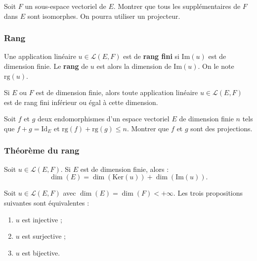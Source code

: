 \documentclass[french]{article}
\renewcommand{\ker}{\text{Ker}}
\newcommand{\rg}{\text{rg}}
\theoremstyle{plain}
\theoremstyle{definition}
\theoremstyle{remark}
\begin{document}
\begin{exo}
	Soit $F$ un sous-espace vectoriel de $E$. Montrer que tous les supplémentaires de $F$ dans $E$ sont isomorphes. On pourra utiliser un projecteur.
\end{exo}

\subsubsection*{Rang}

\begin{dfn}
	Une application linéaire $u\in\mathcal{L}(E,F)$ est de \textbf{rang fini} si $\text{Im}(u)$ est de dimension finie. Le \textbf{rang} de $u$ est alors la dimension de $\text{Im}(u)$. On le note $\rg(u)$.
\end{dfn}

\begin{prop}%
	Si $E$ ou $F$ est de dimension finie, alors toute application linéaire $u\in\mathcal{L}(E,F)$ est de rang fini inférieur ou égal à cette dimension.
\end{prop}

\begin{exo}
	Soit $f$ et $g$ deux endomorphismes d'un espace vectoriel $E$ de dimension finie $n$ tels que $f+g=\text{Id}_E$ et $\rg(f)+\rg(g)\leqslant n$. Montrer que $f$ et $g$ sont des projections.
\end{exo}

\subsubsection*{Théorème du rang}

\begin{thm}%
	Soit $u\in\mathcal{L}(E,F)$. Si $E$ est de dimension finie, alors : $$\dim(E)=\dim(\ker(u))+\dim(\text{Im}(u)).$$
\end{thm}

\begin{cor}%
	Soit $u\in\mathcal{L}(E,F)$ avec $\dim(E)=\dim(F)<+\infty$. Les trois propositions suivantes sont équivalentes : 
	\begin{enumerate}[label=(\roman*)]
		\item $u$ est injective ;
		\item $u$ est surjective ;
		\item $u$ est bijective.
	\end{enumerate}
\end{cor}
\end{document}
